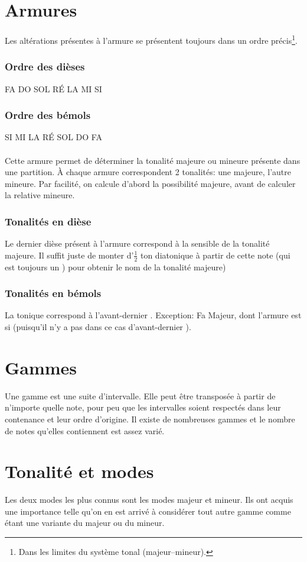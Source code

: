 \documentclass[11pt]{scrreprt}
\begin{document}
\section{Armures}
Les altérations présentes à l'armure se présentent toujours dans un ordre précis\footnote{Dans les limites du système tonal (majeur--mineur).}.
\subsubsection{Ordre des dièses}
FA DO SOL RÉ LA MI SI
\subsubsection{Ordre des bémols}
SI MI LA RÉ SOL DO FA
\\
\\
Cette armure permet de déterminer la tonalité majeure ou mineure présente dans une partition. À chaque armure correspondent 2 tonalités: une majeure, l'autre mineure. Par facilité, on calcule d'abord la possibilité majeure, avant de calculer la relative mineure.

\subsubsection{Tonalités en dièse}
Le dernier dièse présent à l'armure correspond à la sensible de la tonalité majeure. Il suffit juste de monter d'$\frac1 2$ ton diatonique à partir de cette note (qui est toujours un \sharp{}) pour obtenir le nom de la tonalité majeure)
\subsubsection{Tonalités en bémols}
La tonique correspond à l'avant-dernier \flat. Exception: Fa Majeur, dont l'armure est si \flat{} (puisqu'il n'y a pas dans ce cas d'avant-dernier \flat).
\section{Gammes}
Une gamme est une suite d'intervalle. Elle peut être transposée à partir de n'importe quelle note, pour peu que les intervalles soient respectés dans leur contenance et leur ordre d'origine. Il existe de nombreuses gammes et le nombre de notes qu'elles contiennent est assez varié.
\section{Tonalité et modes}
Les deux modes les plus connus sont les modes majeur  et mineur. Ils ont acquis une importance telle qu'on en est arrivé à considérer tout autre gamme comme étant une variante du majeur ou du mineur.
\end{document}
